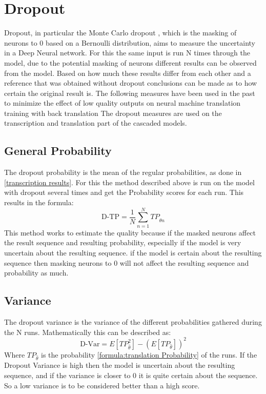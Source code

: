 \section{Dropout}
Dropout, in particular the Monte Carlo dropout \cite{gal2016dropoutbayesianapproximationrepresenting}, which is the masking of neurons to 0 based on a Bernoulli distribution, aims to measure the uncertainty in a Deep Neural network. 
For this the same input is run N times through the model, due to the potential masking of neurons different results can be observed from the model. Based on how much these results differ from each other and a reference that was obtained without dropout conclusions can be made as to how certain the original result is. 
The following measures have been used in the past to minimize the effect of low quality outputs on neural machine translation training with back translation \cite{wang-etal-2018-alibaba}
The dropout measures are used on the transcription and translation part of the cascaded models. 


\subsection{General Probability}
\label{dropoutprob}
The dropout probability is the mean of the regular probabilities, as done in \ref{transcription results}. 
For this the method described above is run on the model with dropout several times and get the Probability scores for each run. 
This results in the formula:
$$\text{D-TP}=\frac{1}{N}\sum_{n=1}^N TP_{\hat\theta n}\label{formula:dropoutprobability}$$
This method works to estimate the quality because if the masked neurons affect the result sequence and resulting probability, especially if the model is very uncertain about the resulting sequence. if the model is certain about the resulting sequence then masking neurons to 0 will not affect the resulting sequence and probability as much. 

\subsection{Variance}
\label{dropoutvar}
The dropout variance is the variance of the different probabilities gathered during the N runs. 
Mathematically this can be described as:
$$\text{D-Var}=E[TP_{\hat\theta}^2]-(E[TP_{\hat\theta}])^2\label{formula:dropoutvariance}$$
Where $TP_{\hat\theta}$ is the probability \ref{formula:translation Probability} of the runs. 
If the Dropout Variance is high then the model is uncertain about the resulting sequence, and if the variance is closer to 0 it is quite certain about the sequence.
So a low variance is to be considered better than a high score.

